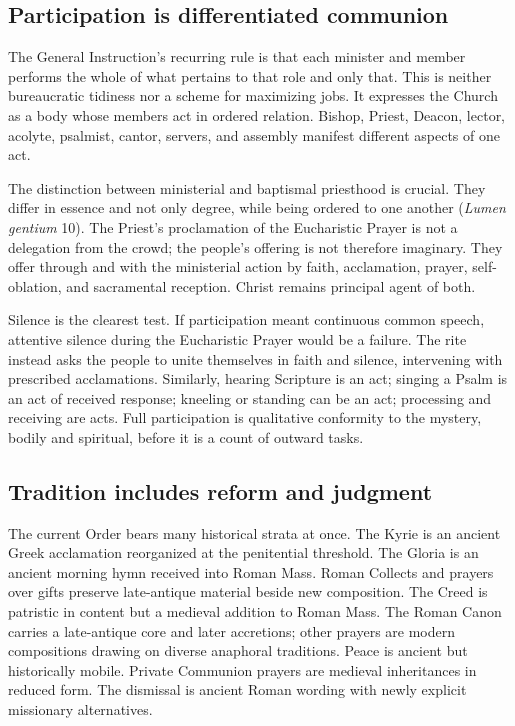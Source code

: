 \subsection{Participation is differentiated communion}

The General Instruction's recurring rule is that each minister and member performs the whole of what pertains to that role and only that. This is neither bureaucratic tidiness nor a scheme for maximizing jobs. It expresses the Church as a body whose members act in ordered relation. Bishop, Priest, Deacon, lector, acolyte, psalmist, cantor, servers, and assembly manifest different aspects of one act.

The distinction between ministerial and baptismal priesthood is crucial. They differ in essence and not only degree, while being ordered to one another (\emph{Lumen gentium} 10). The Priest's proclamation of the Eucharistic Prayer is not a delegation from the crowd; the people's offering is not therefore imaginary. They offer through and with the ministerial action by faith, acclamation, prayer, self-oblation, and sacramental reception. Christ remains principal agent of both.

Silence is the clearest test. If participation meant continuous common speech, attentive silence during the Eucharistic Prayer would be a failure. The rite instead asks the people to unite themselves in faith and silence, intervening with prescribed acclamations. Similarly, hearing Scripture is an act; singing a Psalm is an act of received response; kneeling or standing can be an act; processing and receiving are acts. Full participation is qualitative conformity to the mystery, bodily and spiritual, before it is a count of outward tasks.

\subsection{Tradition includes reform and judgment}

The current Order bears many historical strata at once. The Kyrie is an ancient Greek acclamation reorganized at the penitential threshold. The Gloria is an ancient morning hymn received into Roman Mass. Roman Collects and prayers over gifts preserve late-antique material beside new composition. The Creed is patristic in content but a medieval addition to Roman Mass. The Roman Canon carries a late-antique core and later accretions; other prayers are modern compositions drawing on diverse anaphoral traditions. Peace is ancient but historically mobile. Private Communion prayers are medieval inheritances in reduced form. The dismissal is ancient Roman wording with newly explicit missionary alternatives.

